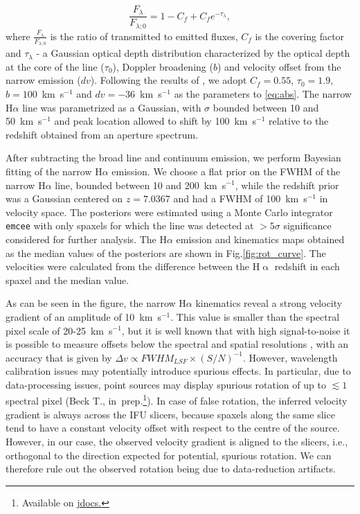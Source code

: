 \documentclass[twocolumn, fleqn]{doc_class}
\newcommand{\Halpha}{\ensuremath{\mathrm{H}\upalpha}\xspace}
\begin{document}
\begin{equation}
\label{eq:abs}
    \frac{F_{\lambda}}{F_{\lambda;0}} = 1 - C_f + C_fe^{-\tau_\lambda},
\end{equation}
where $\frac{F_{\lambda}}{F_{\lambda;0}}$ is the ratio of transmitted to emitted fluxes,  $C_f$ is the covering factor and $\tau_{\lambda}$ - a Gaussian optical depth distribution characterized by the optical depth at the core of the line ($\tau_0$), Doppler broadening ($b$) and velocity offset from the narrow emission ($dv$). Following the results of , we adopt $C_f = 0.55$, $\tau_0 = 1.9$, $b = 100$~km~s$^{-1}$ and $dv = -36$~km~s$^{-1}$ as the parameters to \autoref{eq:abs}. The narrow H$\alpha$ line was parametrized as a Gaussian, with $\sigma$ bounded between 10 and 50~km~s$^{-1}$ and peak location allowed to shift by 100~km~s$^{-1}$ relative to the redshift obtained from an aperture spectrum.

After subtracting the broad line and continuum emission, we perform Bayesian fitting of the narrow H$\alpha$ emission. We choose a flat prior on the FWHM of the narrow H$\alpha$ line, bounded between 10 and 200~km~s$^{-1}$, while the redshift prior was a Gaussian centered on $z = 7.0367$  and had a FWHM of 100~km~s$^{-1}$ in velocity space. The posteriors were estimated using a Monte Carlo integrator \texttt{emcee}  with only spaxels for which the line was detected at $>5\sigma$ significance considered for further analysis. The H$\alpha$ emission and kinematics maps obtained as the median values of the posteriors are shown in Fig.\ref{fig:rot_curve}. The velocities were calculated from the difference between the \Halpha redshift in each spaxel and the median value.

As can be seen in the figure, the narrow H$\alpha$ kinematics reveal a strong velocity gradient of an amplitude of 10~km~s$^{-1}$. This value is smaller than the spectral pixel scale of 20-25~km~s$^{-1}$, but it is well known that with high signal-to-noise it is possible to measure offsets below the spectral and spatial resolutions , with an accuracy that is given by $\Delta v\propto FWHM_{LSF}\times (S/N)^{-1}$. However, wavelength calibration issues may potentially introduce spurious effects. In particular, due to data-processing issues, point sources may display spurious rotation of up to $\lesssim 1$ spectral pixel (Beck T., in~prep.\footnote{Available on \href{https://jwst-docs.stsci.edu/known-issues-with-jwst-data/nirspec-known-issues/nirspec-ifu-known-issues\#gsc.tab=0}{jdocs.}}). In case of false rotation, the inferred velocity gradient is always across the IFU slicers, because spaxels along the same slice tend to have a constant velocity offset with respect to the centre of the source.
However, in our case, the observed velocity gradient is aligned to the slicers, i.e., orthogonal to the direction expected for potential, spurious rotation. We can therefore rule out the observed rotation being due to data-reduction artifacts. 
\end{document}
